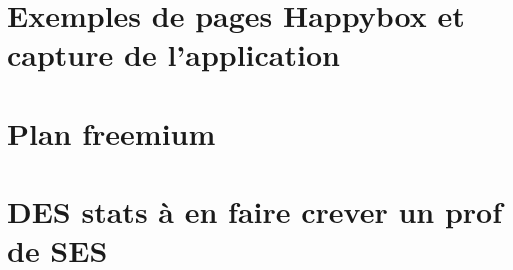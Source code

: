 \documentclass[11pt, a4paper ]{article}
\let\stdsection\section
\renewcommand\section{\newpage\stdsection}
\begin{document}
\begin{spacing}{1.5}
	\section{Exemples de pages Happybox et capture de l'application}
	\section{Plan freemium}

	\section{DES stats à en faire crever un prof de SES}

	\printindex

	
	
\end{spacing}
\end{document}
